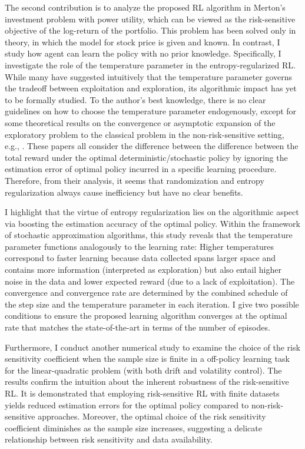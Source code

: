 The second contribution is to analyze the proposed RL algorithm in Merton's investment problem with power utility, which can be viewed as the risk-sensitive objective of the log-return of the portfolio. This problem has been solved only in theory, in which the model for stock price is given and known. In contrast, I study how agent can learn the policy with no prior knowledge. Specifically, I investigate the role of the temperature parameter in the entropy-regularized RL.  While many have suggested intuitively that the temperature parameter governs the tradeoff between exploitation and exploration, its algorithmic impact has yet to be formally studied. To the author's best knowledge, there is no clear guidelines on how to choose the temperature parameter endogenously, except for some theoretical results on the convergence or asymptotic expansion of the exploratory problem to the classical problem in the non-risk-sensitive setting, e.g., \citet{wang2020reinforcement,tang2021exploratory,dai2023recursive}. These papers all consider the difference between the difference between the total reward under the optimal deterministic/stochastic policy by ignoring the estimation error of optimal policy incurred in a specific learning procedure. Therefore, from their analysis, it seems that randomization and entropy regularization always cause inefficiency but have no clear benefits.

I highlight that the virtue of entropy regularization lies on the algorithmic aspect via boosting the estimation accuracy of the optimal policy. Within the framework of stochastic approximation algorithms, this study reveals that the temperature parameter functions analogously to the learning rate: Higher temperatures correspond to faster learning because data collected spans larger space and contains more information (interpreted as exploration) but also entail higher noise in the data and lower expected reward (due to a lack of exploitation). The convergence and convergence rate are determined by the combined schedule of the step size and the temperature parameter in each iteration. I give two possible conditions to ensure the proposed learning algorithm converges at the optimal rate that matches the state-of-the-art in terms of the number of episodes.

Furthermore, I conduct another numerical study to examine the choice of the risk sensitivity coefficient when the sample size is finite in a off-policy learning task for the linear-quadratic problem (with both drift and volatility control). The results confirm the intuition about the inherent robustness of the risk-sensitive RL. It is demonstrated that employing risk-sensitive RL with finite datasets yields reduced estimation errors for the optimal policy compared to non-risk-sensitive approaches. Moreover, the optimal choice of the risk sensitivity coefficient diminishes as the sample size increases, suggesting a delicate relationship between risk sensitivity and data availability.
